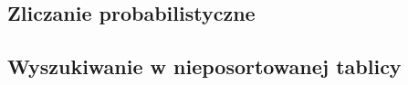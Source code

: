 \subsection{} %

\subsection{} %
\subsection{} %
\subsection{} %
\subsection{} %
\subsection{} %
\subsection{} %

\problems

\subsection{Zliczanie probabilistyczne} %

\subsubsection{} %
\subsubsection{} %

\subsection{Wyszukiwanie w nieposortowanej tablicy} %

